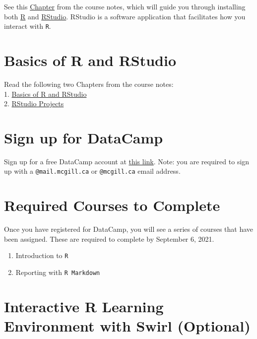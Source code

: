 \documentclass[letterpaper,12pt,twoside,]{pinp}
\providecommand{\tightlist}{%
  \setlength{\itemsep}{0pt}\setlength{\parskip}{0pt}}
\begin{document}
See this \href{https://sahirbhatnagar.com/EPIB607/install.html}{Chapter}
from the course notes, which will guide you through installing both
\href{https://cran.r-project.org/}{R} and
\href{https://www.rstudio.com/products/rstudio/download/preview/}{RStudio}.
RStudio is a software application that facilitates how you interact with
\texttt{R}.

\hypertarget{basics-of-r-and-rstudio}{%
\section{Basics of R and RStudio}\label{basics-of-r-and-rstudio}}

Read the following two Chapters from the course notes:\\
1. \href{https://sahirbhatnagar.com/EPIB607/basics.html}{Basics of R and
RStudio}\\
2. \href{https://sahirbhatnagar.com/EPIB607/projects.html}{RStudio
Projects}

\hypertarget{sign-up-for-datacamp}{%
\section{Sign up for DataCamp}\label{sign-up-for-datacamp}}

Sign up for a free DataCamp account at
\href{https://www.datacamp.com/groups/shared_links/3dae8b789a824d0761a650b316c1d10a25cda8934ccf214aa7cd8366d07ed301}{this
link}. Note: you are required to sign up with a \texttt{@mail.mcgill.ca}
or \texttt{@mcgill.ca} email address.

\hypertarget{required-courses-to-complete}{%
\section{Required Courses to
Complete}\label{required-courses-to-complete}}

Once you have registered for DataCamp, you will see a series of courses
that have been assigned. These are required to complete by September 6,
2021.

\begin{enumerate}
\def\labelenumi{\arabic{enumi}.}
\tightlist
\item
  Introduction to \texttt{R}
\item
  Reporting with \texttt{R\ Markdown}
\end{enumerate}

\hypertarget{interactive-r-learning-environment-with-swirl-optional}{%
\section{Interactive R Learning Environment with Swirl
(Optional)}\label{interactive-r-learning-environment-with-swirl-optional}}
\end{document}

